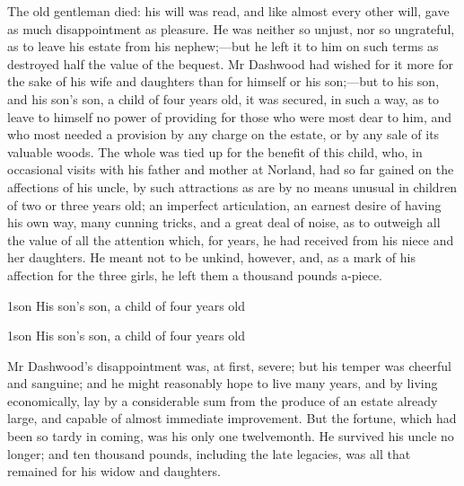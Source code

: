 The old gentleman died: his will was read, and like almost every other will, gave as much disappointment as pleasure. He was neither so unjust, nor so ungrateful, as to leave his estate from his nephew;—but he left it to him on such terms as destroyed half the value of the bequest. Mr Dashwood had wished for it more for the sake of his wife and daughters than for himself or his son;—but to his son, and his son's son, a child of four years old, it was secured, in such a way, as to leave to himself no power of providing for those who were most dear to him, and who most needed a provision by any charge on the estate, or by any sale of its valuable woods. The whole was tied up for the benefit of this child, who, in occasional visits with his father and mother at Norland, had so far gained on the affections of his uncle, by such attractions as are by no means unusual in children of two or three years old; an imperfect articulation, an earnest desire of having his own way, many cunning tricks, and a great deal of noise, as to outweigh all the value of all the attention which, for years, he had received from his niece and her daughters. He meant not to be unkind, however, and, as a mark of his affection for the three girls, he left them a thousand pounds a-piece.


\begin{letter}
\begin{bwbigpic}
	[1.0]
	{1son} 
	{His son's son, a child of four years old} 
\end{bwbigpic}
\end{letter}

\begin{a4}
\begin{bwbigpic}
	[0.9]
	{1son} 
	{His son's son, a child of four years old} 
\end{bwbigpic}
\end{a4}

Mr Dashwood's disappointment was, at first, severe; but his temper was cheerful and sanguine; and he might reasonably hope to live many years, and by living economically, lay by a considerable sum from the produce of an estate already large, and capable of almost immediate improvement. But the fortune, which had been so tardy in coming, was his only one twelvemonth. He survived his uncle no longer; and ten thousand pounds, including the late legacies, was all that remained for his widow and daughters.

